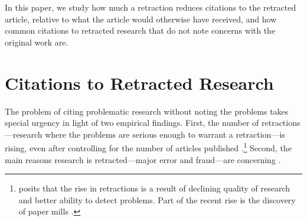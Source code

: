 \documentclass[11pt,letterpaper]{article}
\begin{document}
In this paper, we study how much a retraction reduces citations to the retracted article, relative to what the article would otherwise have received, and how common citations to retracted research that do not note concerns with the original work are.

\section{Citations to Retracted Research}
The problem of citing problematic research without noting the problems takes special urgency in light of two empirical findings. First, the number of retractions---research where the problems are serious enough to warrant a retraction---is rising, even after controlling for the number of articles published \citep{grieneisen2012comprehensive, steen2011retractions, oransky2022retractions, vannoorden2023more}.\footnote{\citet{steen2013has} posits that the rise in retractions is a result of declining quality of research and better ability to detect problems. Part of the recent rise is the discovery of paper mills \citep{else2021fight, candalpedreira2022retracted}.} Second, the main reasons research is retracted---major error and fraud---are concerning \citep{bozzo2017retractions, grieneisen2012comprehensive, singh2014comprehensive, fang2012misconduct, wager2011why}.
\end{document}
